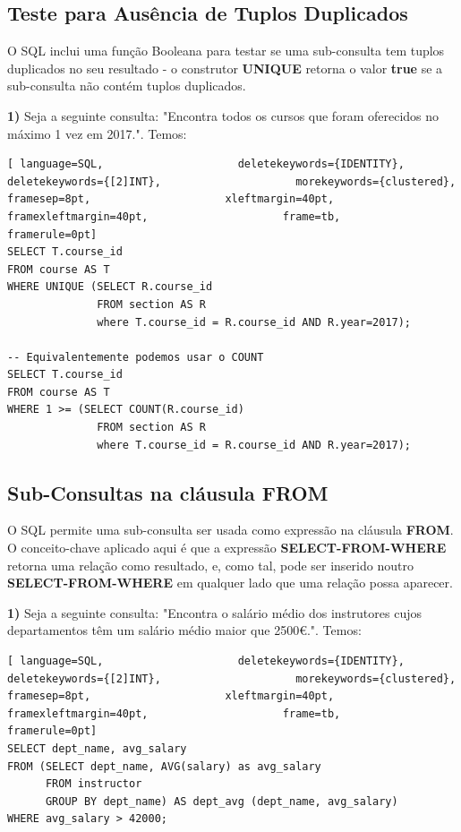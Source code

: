 \documentclass[oneside]{book}
\theoremstyle{definition}
\begin{document}
\subsection{Teste para Ausência de Tuplos Duplicados}
O SQL inclui uma função Booleana para testar se uma sub-consulta tem tuplos duplicados no seu resultado - o construtor \textbf{UNIQUE} retorna o valor \textbf{true} se a sub-consulta não contém tuplos duplicados.

\textbf{1)} Seja a seguinte consulta: "Encontra todos os cursos que foram oferecidos no máximo 1 vez em 2017.". Temos:
\begin{lstlisting}[ language=SQL,                     deletekeywords={IDENTITY},                     deletekeywords={[2]INT},                     morekeywords={clustered},                     framesep=8pt,                     xleftmargin=40pt,                     framexleftmargin=40pt,                     frame=tb,                     framerule=0pt]
SELECT T.course_id
FROM course AS T
WHERE UNIQUE (SELECT R.course_id
              FROM section AS R
              where T.course_id = R.course_id AND R.year=2017);
              
-- Equivalentemente podemos usar o COUNT
SELECT T.course_id
FROM course AS T
WHERE 1 >= (SELECT COUNT(R.course_id)
              FROM section AS R
              where T.course_id = R.course_id AND R.year=2017);
\end{lstlisting}

\subsection{Sub-Consultas na cláusula FROM}
O SQL permite uma sub-consulta ser usada como expressão na cláusula \textbf{FROM}. O conceito-chave aplicado aqui é que a expressão \textbf{SELECT-FROM-WHERE} retorna uma relação como resultado, e, como tal, pode ser inserido noutro \textbf{SELECT-FROM-WHERE} em qualquer lado que uma relação possa aparecer.

\textbf{1)} Seja a seguinte consulta: "Encontra o salário médio dos instrutores cujos departamentos têm um salário médio maior que 2500€.". Temos:
\begin{lstlisting}[ language=SQL,                     deletekeywords={IDENTITY},                     deletekeywords={[2]INT},                     morekeywords={clustered},                     framesep=8pt,                     xleftmargin=40pt,                     framexleftmargin=40pt,                     frame=tb,                     framerule=0pt]
SELECT dept_name, avg_salary
FROM (SELECT dept_name, AVG(salary) as avg_salary
      FROM instructor
      GROUP BY dept_name) AS dept_avg (dept_name, avg_salary)
WHERE avg_salary > 42000;
\end{lstlisting}
\end{document}
